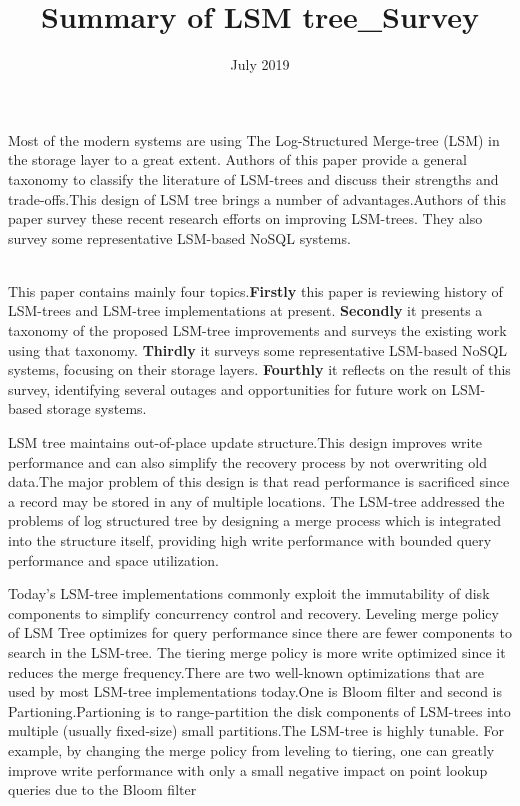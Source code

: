 \documentclass{article}
\title{Summary of LSM tree_Survey}
\date{July 2019}
\begin{document}
Most of the modern systems are using 
The Log-Structured Merge-tree (LSM) in the storage layer to a great extent. Authors of this paper  provide a general taxonomy to classify the literature of LSM-trees and discuss their strengths and trade-offs.This design of LSM tree brings a number of advantages.Authors of this paper   survey these recent research efforts on improving LSM-trees. They also survey  some representative LSM-based NoSQL systems. 
\\ \\
\par
\newline
This paper contains mainly four topics.\textbf{Firstly} this paper  is reviewing  history of LSM-trees and  LSM-tree implementations at present.\textbf{ Secondly}    it 
presents a taxonomy of the proposed LSM-tree improvements
and surveys the existing work using that taxonomy.
\textbf{ Thirdly }it  surveys some representative LSM-based NoSQL
systems, focusing on their storage layers.\textbf{ Fourthly} it  reflects
on the result of this survey, identifying several outages and
opportunities for future work on LSM-based storage systems.
\\
\par
LSM tree maintains out-of-place update structure.This design improves write
performance and  can also simplify the recovery process by not overwriting
old data.The major problem of this design
is that read performance is sacrificed since a record may be
stored in any of multiple locations.
The LSM-tree addressed the  problems of log structured tree by designing a merge process which is integrated
into the structure itself, providing high write performance
with bounded query performance and space utilization.
\\
\par
Today’s LSM-tree implementations commonly exploit
the immutability of disk components to simplify concurrency
control and recovery. 
Leveling merge policy of LSM Tree optimizes for query performance
since there are fewer components to search in the LSM-tree.
The tiering merge policy is more write optimized since it reduces
the merge frequency.There are two well-known optimizations that are used by
most LSM-tree implementations today.One is Bloom filter and second is Partioning.Partioning is to range-partition the disk components of LSM-trees into
multiple (usually fixed-size) small partitions.The LSM-tree is highly tunable. For example, by changing
the merge policy from leveling to tiering, one can greatly
improve write performance with only a small negative impact on point lookup queries due to the Bloom filter
\end{document}
